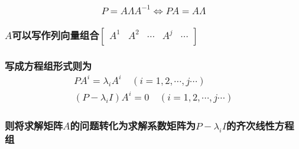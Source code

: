 \documentclass[11pt]{article}
\begin{document}
\subsubsection{\texorpdfstring{\[P=A\Lambda A^{-1}\Leftrightarrow 
     PA=A\Lambda
     \]}{P=A\textbackslash{}Lambda A\^{}\{-1\}\textbackslash{}Leftrightarrow 
     PA=A\textbackslash{}Lambda
     }}\label{palambda-a-1leftrightarrow-paalambda}

\subsubsection{\texorpdfstring{\(A\)可以写作列向量组合\(\begin{bmatrix} A^1 & A^2 & \cdots & A^j & \cdots\\ \end{bmatrix}\)}{A可以写作列向量组合\textbackslash{}begin\{bmatrix\} A\^{}1 \& A\^{}2 \& \textbackslash{}cdots \& A\^{}j \& \textbackslash{}cdots\textbackslash{}\textbackslash{} \textbackslash{}end\{bmatrix\}}}\label{aux53efux4ee5ux5199ux4f5cux5217ux5411ux91cfux7ec4ux5408beginbmatrix-a1-a2-cdots-aj-cdots-endbmatrix}

\subsubsection{\texorpdfstring{写成方程组形式则为\[\begin{split}  PA^i=\lambda_iA^i \quad (i=1,2,\cdots,j\cdots)\\
                     (P-\lambda_i I)A^i=0 \quad (i=1,2,\cdots,j\cdots)\end{split}\]}{写成方程组形式则为\textbackslash{}begin\{split\}  PA\^{}i=\textbackslash{}lambda\_iA\^{}i \textbackslash{}quad (i=1,2,\textbackslash{}cdots,j\textbackslash{}cdots)\textbackslash{}\textbackslash{}
                     (P-\textbackslash{}lambda\_i I)A\^{}i=0 \textbackslash{}quad (i=1,2,\textbackslash{}cdots,j\textbackslash{}cdots)\textbackslash{}end\{split\}}}\label{ux5199ux6210ux65b9ux7a0bux7ec4ux5f62ux5f0fux5219ux4e3abeginsplit-pailambda_iai-quad-i12cdotsjcdots-p-lambda_i-iai0-quad-i12cdotsjcdotsendsplit}

\subsubsection{\texorpdfstring{则将求解矩阵\(A\)的问题转化为求解系数矩阵为\(P-\lambda_i I\)的齐次线性方程组}{则将求解矩阵A的问题转化为求解系数矩阵为P-\textbackslash{}lambda\_i I的齐次线性方程组}}\label{ux5219ux5c06ux6c42ux89e3ux77e9ux9635aux7684ux95eeux9898ux8f6cux5316ux4e3aux6c42ux89e3ux7cfbux6570ux77e9ux9635ux4e3ap-lambda_i-iux7684ux9f50ux6b21ux7ebfux6027ux65b9ux7a0bux7ec4}
\end{document}
